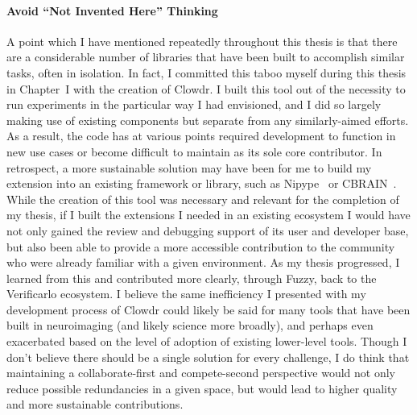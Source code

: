 \paragraph*{Avoid ``Not Invented Here'' Thinking}
A point which I have mentioned repeatedly throughout this thesis is that there are a considerable number of
libraries that have been built to accomplish similar tasks, often in isolation. In fact, I committed this taboo
myself during this thesis in Chapter~I with the creation of Clowdr. I built this tool out of the necessity to run
experiments in the particular way I had envisioned, and I did so largely making use of existing components but
separate from any similarly-aimed efforts. As a result, the code has at various points required development to
function in new use cases or become difficult to maintain as its sole core contributor. In retrospect, a more
sustainable solution may have been for me to build my extension into an existing framework or library, such as
Nipype~\cite{gorgolewski2011nipype} or CBRAIN~\cite{sherif2014cbrain}. While the creation of this tool was
necessary and relevant for the completion of my thesis, if I built the extensions I needed in an existing ecosystem
I would have not only gained the review and debugging support of its user and developer base, but also been able to
provide a more accessible contribution to the community who were already familiar with a given environment. As my
thesis progressed, I learned from this and contributed more clearly, through Fuzzy, back to the Verificarlo
ecosystem. I believe the same inefficiency I presented with my development process of Clowdr could likely be said for
many tools that have been built in neuroimaging (and likely science more broadly), and perhaps even exacerbated based
on the level of adoption of existing lower-level tools. Though I don't believe there should be a single solution for
every challenge, I do think that maintaining a collaborate-first and compete-second perspective would not only reduce
possible redundancies in a given space, but would lead to higher quality and more sustainable contributions.

